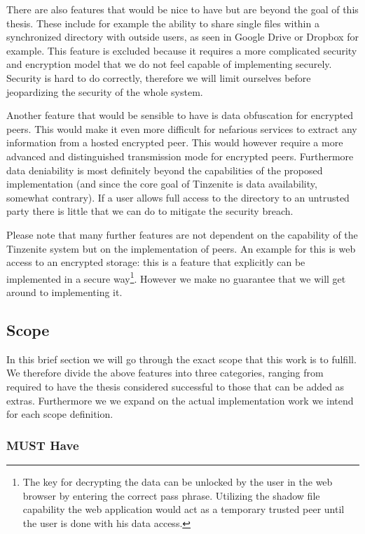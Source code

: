 There are also features that would be nice to have but are beyond the goal of this thesis.
These include for example the ability to share single files within a synchronized directory with outside users, as seen in Google Drive or Dropbox for example.
This feature is excluded because it requires a more complicated security and encryption model that we do not feel capable of implementing securely.
Security is hard to do correctly, therefore we will limit ourselves before jeopardizing the security of the whole system.

Another feature that would be sensible to have is data obfuscation for encrypted peers.
This would make it even more difficult for nefarious services to extract any information from a hosted encrypted peer.
This would however require a more advanced and distinguished transmission mode for encrypted peers.
Furthermore data deniability is most definitely beyond the capabilities of the proposed implementation (and since the core goal of Tinzenite is data availability, somewhat contrary).
If a user allows full access to the directory to an untrusted party there is little that we can do to mitigate the security breach.

Please note that many further features are not dependent on the capability of the Tinzenite system but on the implementation of peers.
An example for this is web access to an encrypted storage: this is a feature that explicitly can be implemented in a secure way\footnote{The key for decrypting the data can be unlocked by the user in the web browser by entering the correct pass phrase. Utilizing the shadow file capability the web application would act as a temporary trusted peer until the user is done with his data access.}.
However we make no guarantee that we will get around to implementing it.

\subsection{Scope}

In this brief section we will go through the exact scope that this work is to fulfill.
We therefore divide the above features into three categories, ranging from required to have the thesis considered successful to those that can be added as extras.
Furthermore we we expand on the actual implementation work we intend for each scope definition.

\subsubsection{MUST Have}
\label{subs:MUST Have}

